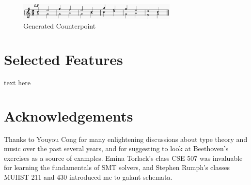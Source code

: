 \documentclass[sigplan,screen]{acmart}
\begin{document}
\begin{figure}
  \includegraphics[width=8cm]{figures/b146gen3.png}
  \caption{Generated Counterpoint}
  \label{fig:b146gen3}
\end{figure}


\section{Selected Features}

text here


\section*{Acknowledgements}

Thanks to Youyou Cong for many enlightening discussions about type
theory and music over the past several years, and for suggesting to
look at Beethoven's exercises as a source of examples. Emina Torlack's
class CSE 507 was invaluable for learning the fundamentals of SMT
solvers, and Stephen Rumph's classes MUHST 211 and 430 introduced me
to galant schemata.


\end{document}

